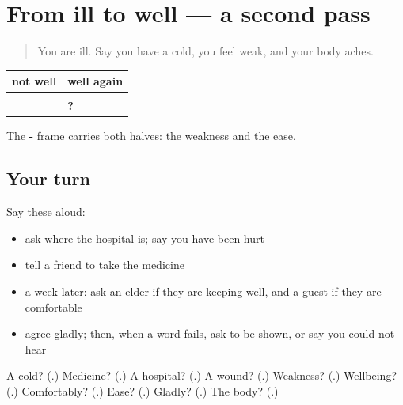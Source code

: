 \section[(dialogue)]{From ill to well — a second pass}

\label{lesson:TE-R95-second-pass-health}



\begin{quote}
You are ill. Say you have a cold, you feel weak, and your body aches.
\end{quote}

\begin{grammarlens}[title={Grammar Lens: ill and well in one frame}]
\noindent
\begin{tabularx}{\linewidth}{@{}>{\raggedright\arraybackslash}X>{\raggedright\arraybackslash}X@{}}
\toprule
\textbf{not well} & \textbf{well again} \\
\midrule
\textbf{\te{నాకు} \te{నీరసంగా} \te{ఉంది}} & \textbf{\te{హాయిగా} \te{ఉంది}} \\
\textbf{\te{జలుబు} \te{చేసింది}} & \textbf{\te{క్షేమంగా} \te{ఉన్నారా}?} \\
\bottomrule
\end{tabularx}

The \textbf{- } frame carries both halves: the weakness and the ease.
\end{grammarlens}

\subsection*{Your turn}
Say these aloud:

\begin{itemize}
\raggedright
  \item ask where the hospital is; say you have been hurt
  \item tell a friend to take the medicine
  \item a week later: ask an elder if they are keeping well, and a guest if they are comfortable
  \item agree gladly; then, when a word fails, ask to be shown, or say you could not hear
\end{itemize}

\begin{tcolorbox}[breakable,colback=teal!4,colframe=teal!35!black,title={Before you move on}]
A cold? (\textbf{}.) Medicine? (\textbf{}.) A hospital? (\textbf{}.) A wound? (\textbf{}.) Weakness? (\textbf{}.) Wellbeing? (\textbf{}.) Comfortably? (\textbf{}.) Ease? (\textbf{}.) Gladly? (\textbf{}.) The body? (\textbf{}.)
\end{tcolorbox}
